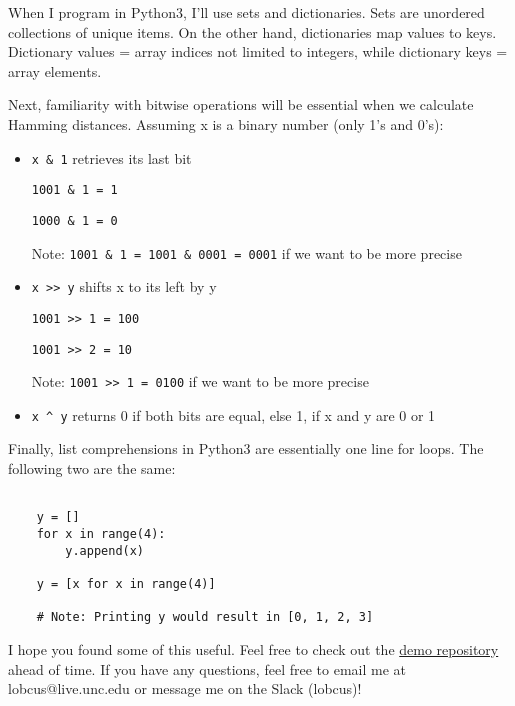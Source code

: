 \documentclass{article}
\begin{document}
When I program in Python3, I'll use sets and dictionaries. Sets are unordered collections of unique items. On the other hand, dictionaries map values to keys. Dictionary values = array indices not limited to integers, while dictionary keys = array elements. 

\vspace{1pc}

Next, familiarity with bitwise operations will be essential when we calculate Hamming distances. Assuming x is a binary number (only 1's and 0's):
\begin{itemize}
	\item \verb|x & 1| retrieves its last bit
		\begin{center}
			\verb|1001 & 1 = 1|

			\verb|1000 & 1 = 0|
		\end{center}
		Note: \verb|1001 & 1 = 1001 & 0001 = 0001| if we want to be more precise

	\item \verb|x >> y| shifts x to its left by y
		\begin{center}
			\verb|1001 >> 1 = 100|

			\verb|1001 >> 2 = 10|
		\end{center}
		Note: \verb|1001 >> 1 = 0100| if we want to be more precise

	\item \verb|x ^ y| returns 0 if both bits are equal, else 1, if x and y are 0 or 1
\end{itemize}

\vspace{1pc}

Finally, list comprehensions in Python3 are essentially one line for loops. The following two are the same:
\begin{verbatim}
	
	y = []
	for x in range(4):
		y.append(x)
	
	y = [x for x in range(4)]

	# Note: Printing y would result in [0, 1, 2, 3]
\end{verbatim}

\vspace{1pc}

I hope you found some of this useful. Feel free to check out the \href{https://github.com/ntropy-unc/Cryptopals}{demo repository} ahead of time. If you have any questions, feel free to email me at lobcus@live.unc.edu or message me on the Slack (lobcus)!
\end{document}
